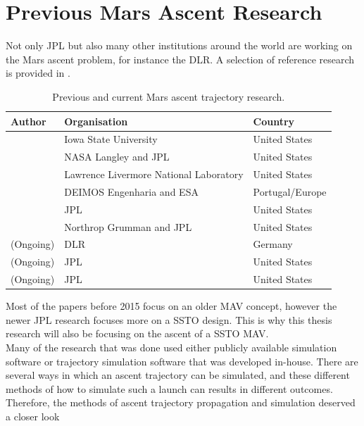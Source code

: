 
\section{Previous Mars Ascent Research}
\label{sec:previousMarsAscentResearch}
Not only \ac{JPL} but also many other institutions around the world are working on the Mars ascent problem, for instance the \ac{DLR}. A selection of reference research is provided in .

\begin{table}[H]
\begin{center}
\caption{Previous and current Mars ascent trajectory research.}
\label{tab:referenceResearch}
\begin{tabular}{|l|l|l|}
\hline 
\textbf{Author} 	& \textbf{Organisation} & \textbf{Country} \\ \hline \hline
\cite{fanning1996model} & Iowa State University & United States\\ \hline
\cite{desai1998}& \ac{NASA} Langley and \ac{JPL} & United States \\ \hline
\cite{whitehead2004mars,whitehead2005} & Lawrence Livermore National Laboratory & United States \\ \hline
 \cite{di2007system} & DEIMOS Engenharia and \acs{ESA} & Portugal/Europe \\ \hline
\cite{woolley2011mars} & \ac{JPL} & United States \\ \hline
\cite{trinidad2012} & Northrop Grumman and \ac{JPL} & United States  \\ \hline
\cite{dumont2015design} (Ongoing)& \ac{DLR} 		& Germany \\ \hline
\cite{woolley2015simple} (Ongoing) & \ac{JPL} & United States \\ \hline
\cite{benito2016trajectory} (Ongoing) & \ac{JPL} & United States \\ \hline

\end{tabular}
\end{center}
\end{table}

\noindent
Most of the papers before 2015 focus on an older \ac{MAV} concept, however the newer \ac{JPL} research focuses more on a \ac{SSTO} design. This is why this thesis research will also be focusing on the ascent of a \ac{SSTO} \ac{MAV}. \\
Many of the research that was done used either publicly available simulation software or trajectory simulation software that was developed in-house. There are several ways in which an ascent trajectory can be simulated, and these different methods of how to simulate such a launch can results in different outcomes. Therefore, the methods of ascent trajectory propagation and simulation deserved a closer look


